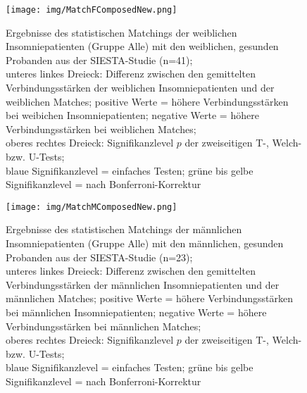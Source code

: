 \begin{figure}[H]
	\centering
	\texttt{[image: img/MatchFComposedNew.png]}
	\caption[Ergebnisse des statistischen Matchings der Insomniepatienten mit den gesunden Probanden]{Ergebnisse des statistischen Matchings der weiblichen Insomniepatienten (Gruppe Alle) mit den weiblichen, gesunden Probanden aus der SIESTA-Studie (n=41);\\unteres linkes Dreieck: Differenz zwischen den gemittelten Verbindungsstärken der weiblichen Insomniepatienten und der weiblichen Matches; positive Werte = höhere Verbindungsstärken bei weibichen Insomniepatienten; negative Werte = höhere Verbindungsstärken bei weiblichen Matches;\\oberes rechtes Dreieck: Signifikanzlevel $p$ der zweiseitigen T-, Welch- bzw. U-Tests;\\blaue Signifikanzlevel = einfaches Testen; grüne bis gelbe Signifikanzlevel = nach Bonferroni-Korrektur}
	\label{fig:MatchFComposedNew}
\end{figure}




\begin{figure}[H]
	\centering
	\texttt{[image: img/MatchMComposedNew.png]}
	\caption[Ergebnisse des statistischen Matchings der Insomniepatienten mit den gesunden Probanden]{Ergebnisse des statistischen Matchings der männlichen Insomniepatienten (Gruppe Alle) mit den männlichen, gesunden Probanden aus der SIESTA-Studie (n=23);\\unteres linkes Dreieck: Differenz zwischen den gemittelten Verbindungsstärken der männlichen Insomniepatienten und der männlichen Matches; positive Werte = höhere Verbindungsstärken bei männlichen Insomniepatienten; negative Werte = höhere Verbindungsstärken bei männlichen Matches;\\oberes rechtes Dreieck: Signifikanzlevel $p$ der zweiseitigen T-, Welch- bzw. U-Tests;\\blaue Signifikanzlevel = einfaches Testen; grüne bis gelbe Signifikanzlevel = nach Bonferroni-Korrektur}
	\label{fig:MatchMComposedNew}
\end{figure}

\restoregeometry